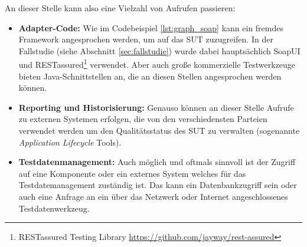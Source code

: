 An dieser Stelle kann also eine Vielzahl von Aufrufen passieren:

\begin{itemize}
\item \textbf{Adapter-Code:} Wie im Codebeispiel \ref{lst:graph_soap} kann ein fremdes Framework angesprochen werden, um auf das \Gls{SUT} zuzugreifen. In der Fallstudie (siehe Abschnitt \ref{sec:fallstudie}) wurde dabei hauptsächlich SoapUI und RESTassured\footnote{RESTassured Testing Library \url{https://github.com/jayway/rest-assured}} verwendet. Aber auch große kommerzielle Testwerkzeuge bieten Java-Schnittstellen an, die an diesen Stellen angesprochen werden können.
\item \textbf{Reporting und Historisierung:} Genauso können an dieser Stelle Aufrufe zu externen Systemen erfolgen, die von den verschiedensten Parteien verwendet werden um den Qualitätsstatus des \Gls{SUT} zu verwalten (sogenannte \textit{Application Lifecycle} Tools). 
\item \textbf{Testdatenmanagement:} Auch möglich und oftmals sinnvoll ist der Zugriff auf eine Komponente oder ein externes System welches für das Testdatemanagement zuständig ist. Das kann ein Datenbankzugriff sein oder auch eine Anfrage an ein über das Netzwerk oder Internet angeschlossenes Testdatenwerkzeug.
\end{itemize}


